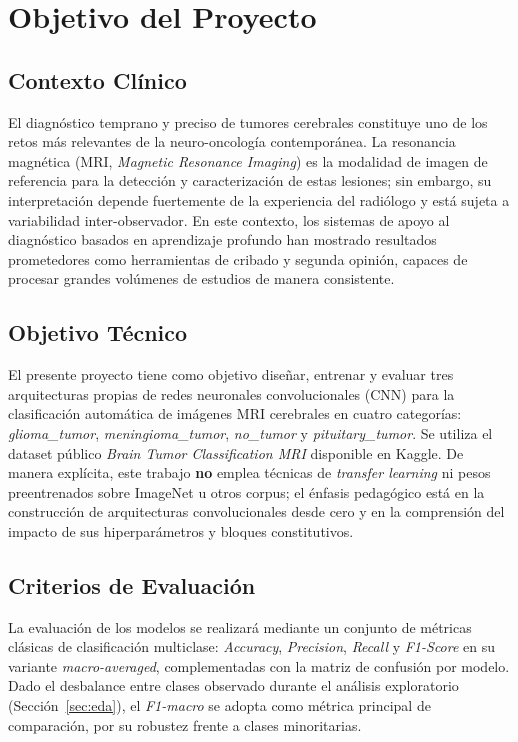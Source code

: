 \section{Objetivo del Proyecto}

\subsection{Contexto Clínico}
El diagnóstico temprano y preciso de tumores cerebrales constituye
uno de los retos más relevantes de la neuro-oncología
contemporánea. La resonancia magnética (MRI, \textit{Magnetic
Resonance Imaging}) es la modalidad de imagen de referencia para
la detección y caracterización de estas lesiones; sin embargo, su
interpretación depende fuertemente de la experiencia del radiólogo
y está sujeta a variabilidad inter-observador. En este contexto,
los sistemas de apoyo al diagnóstico basados en aprendizaje
profundo han mostrado resultados prometedores como herramientas
de cribado y segunda opinión, capaces de procesar grandes
volúmenes de estudios de manera consistente.

\subsection{Objetivo Técnico}
El presente proyecto tiene como objetivo diseñar, entrenar y
evaluar tres arquitecturas propias de redes neuronales
convolucionales (CNN) para la clasificación automática de
imágenes MRI cerebrales en cuatro categorías:
\textit{glioma\_tumor}, \textit{meningioma\_tumor},
\textit{no\_tumor} y \textit{pituitary\_tumor}. Se utiliza el
dataset público \textit{Brain Tumor Classification MRI} disponible
en Kaggle. De manera explícita, este trabajo \textbf{no} emplea
técnicas de \textit{transfer learning} ni pesos preentrenados
sobre ImageNet u otros corpus; el énfasis pedagógico está en la
construcción de arquitecturas convolucionales desde cero y en la
comprensión del impacto de sus hiperparámetros y bloques
constitutivos.

\subsection{Criterios de Evaluación}
La evaluación de los modelos se realizará mediante un conjunto
de métricas clásicas de clasificación multiclase:
\textit{Accuracy}, \textit{Precision}, \textit{Recall} y
\textit{F1-Score} en su variante \textit{macro-averaged},
complementadas con la matriz de confusión por modelo. Dado el
desbalance entre clases observado durante el análisis exploratorio
(Sección~\ref{sec:eda}), el \textit{F1-macro} se adopta como
métrica principal de comparación, por su robustez frente a clases
minoritarias.
